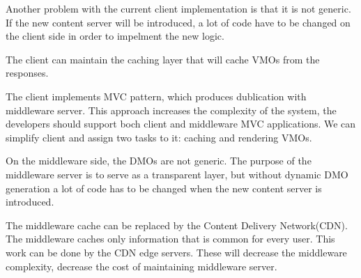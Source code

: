Another problem with the current client implementation is that it is not generic. If the new content server will be introduced, a lot of code have to be changed on the client side in order to impelment the new logic.

The client can maintain the caching layer that will cache VMOs from the responses. 

The client implements MVC pattern, which produces dublication with middleware server. This approach increases the complexity of the system, the developers should support boch client and middleware MVC applications. We can simplify client and assign two tasks to it: caching and rendering VMOs.

On the middleware side, the DMOs are not generic. The purpose of the middleware server is to serve as a transparent layer, but without dynamic DMO generation a lot of code has to be changed when the new content server is introduced.

The middleware cache can be replaced by the Content Delivery Network(CDN). The middleware caches only information that is common for every user. This work can be done by the CDN edge servers. These will decrease the middleware complexity, decrease the cost of maintaining middleware server.



\newpage
